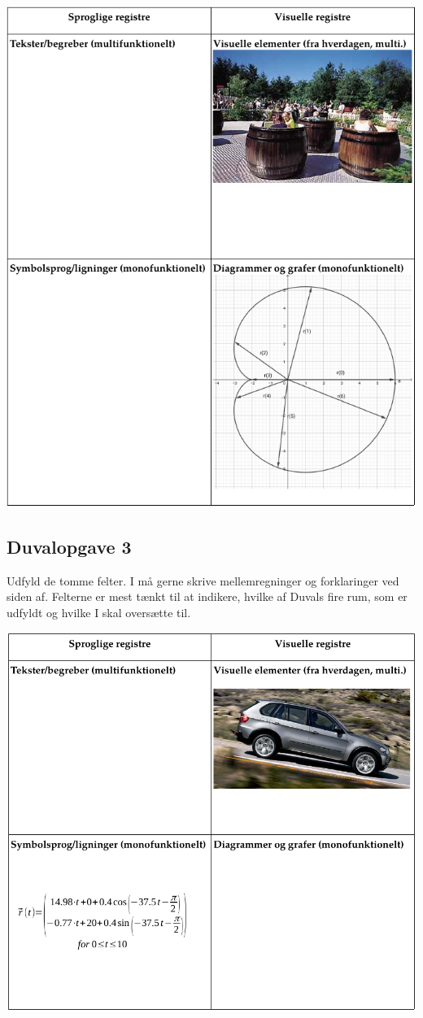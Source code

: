 \documentclass[a4paper, 12pt]{article}
\begin{document}
\begin{center}
\includegraphics[width=.9\linewidth]{img/duvalopgave_2.png}
\end{center}

\newpage

\subsection*{Duvalopgave 3}
\label{sec:org80a836f}

Udfyld de tomme felter. I må gerne skrive mellemregninger og forklaringer ved siden af. Felterne er mest tænkt til at indikere, hvilke af Duvals fire rum, som er udfyldt og hvilke I skal oversætte til.

\begin{center}
\includegraphics[width=.9\linewidth]{img/duvalopgave_3.png}
\end{center}
\end{document}
